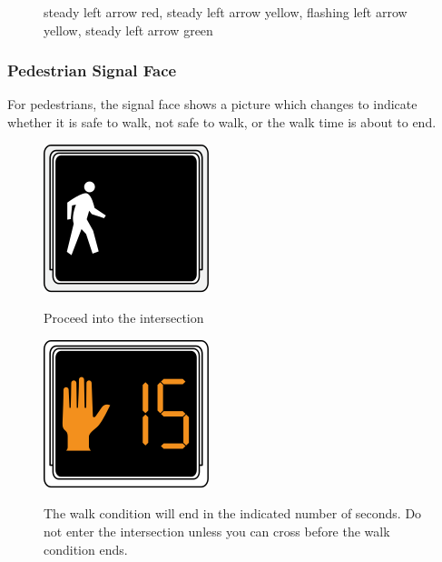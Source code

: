 \documentclass[letterpaper,twoside]{article}
\begin{document}
\begin{figure}[H]
           {\caption{steady left arrow red, steady left arrow yellow, flashing
               left arrow yellow, steady left arrow green}
             \label{signal_llll}}
\end{figure}

\subsubsection{Pedestrian Signal Face}

For pedestrians, the signal face shows a picture which changes to indicate
whether it is safe to walk, not safe to walk, or the walk time is about to end.

\begin{figure}[H]
  \fcapside
           {\includegraphics{MUTCD_Ped_Signal_-_Walk}}
           {\caption{Proceed into the intersection}}
\end{figure}

\begin{figure}[H]
  \fcapside
           {\includegraphics{MUTCD_Ped_Signal_-_Hand_with_timer}}
           {\caption{The walk condition will end in the indicated
               number of seconds.  Do not enter the intersection
               unless you can cross before the walk condition ends.}}
\end{figure}
\end{document}
